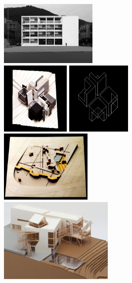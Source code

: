 \begin{figure}[t]
\vspace{-1em}
\includegraphics[height=8.5em]{fig/grammar-fascio.jpg}\quad
{}\\[1em]
\includegraphics[height=9.5em]{fig/grammar-house-x-model.jpg}\quad
\includegraphics[height=9.5em]{fig/grammar-house-x-diagram.jpg}\quad
\includegraphics[height=9.5em]{fig/grammar-la-vilette.jpg}\\[1em]
\includegraphics[height=11.1em]{fig/grammar-familian.jpg}\quad

\end{figure}
